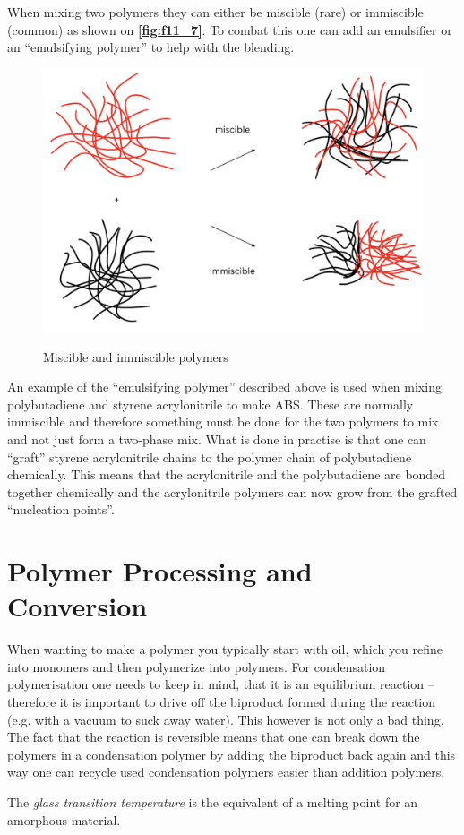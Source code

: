 When mixing two polymers they can either be miscible (rare) or immiscible (common) as shown on \textbf{\autoref{fig:f11_7}}. To combat this one can add an emulsifier or an ``emulsifying polymer'' to help with the blending.
\begin{figure} [ht]
  \centering
  \caption{Miscible and immiscible polymers}
  \includegraphics[width=0.5\linewidth]{./figures/f11_7.png}
  \label{fig:f11_7}
\end{figure}
An example of the ``emulsifying polymer'' described above is used when mixing polybutadiene and styrene acrylonitrile to make ABS. These are normally immiscible and therefore something must be done for the two polymers to mix and not just form a two-phase mix. What is done in practise is that one can ``graft'' styrene acrylonitrile chains to the polymer chain of polybutadiene chemically. This means that the acrylonitrile and the polybutadiene are bonded together chemically and the acrylonitrile polymers can now grow from the grafted ``nucleation points''. 

\section{Polymer Processing and Conversion}
When wanting to make a polymer you typically start with oil, which you refine into monomers and then polymerize into polymers. For condensation polymerisation one needs to keep in mind, that it is an equilibrium reaction -- therefore it is important to drive off the biproduct formed during the reaction (e.g. with a vacuum to suck away water). This however is not only a bad thing. The fact that the reaction is reversible means that one can break down the polymers in a condensation polymer by adding the biproduct back again and this way one can recycle used condensation polymers easier than addition polymers.

\begin{definition}
  The \textit{glass transition temperature} is the equivalent of a melting point for an amorphous material.
\end{definition}

